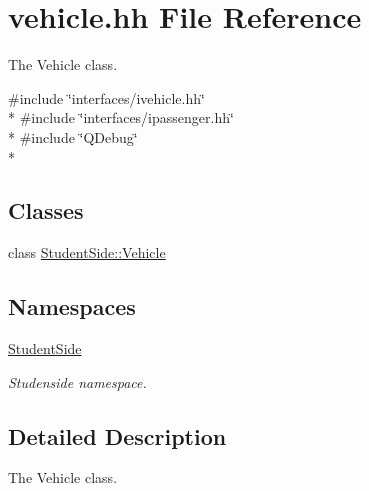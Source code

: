 \hypertarget{vehicle_8hh}{\section{vehicle.\-hh File Reference}
\label{vehicle_8hh}
}


The Vehicle class.  


{\ttfamily \#include \char`\"{}interfaces/ivehicle.\-hh\char`\"{}}\\*
{\ttfamily \#include \char`\"{}interfaces/ipassenger.\-hh\char`\"{}}\\*
{\ttfamily \#include \char`\"{}Q\-Debug\char`\"{}}\\*
\subsection*{Classes}
\begin{DoxyCompactItemize}
\item 
class \hyperlink{class_student_side_1_1_vehicle}{Student\-Side\-::\-Vehicle}
\end{DoxyCompactItemize}
\subsection*{Namespaces}
\begin{DoxyCompactItemize}
\item 
\hyperlink{namespace_student_side}{Student\-Side}
\begin{DoxyCompactList}\small\item\em Studenside namespace. \end{DoxyCompactList}\end{DoxyCompactItemize}


\subsection{Detailed Description}
The Vehicle class. 